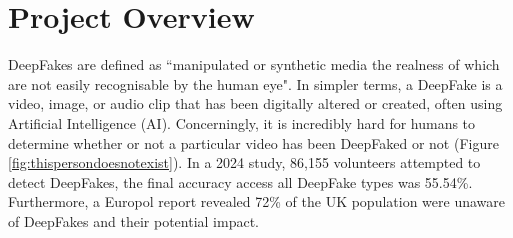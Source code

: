 
\section{Project Overview}
\label{sec:project-review}

DeepFakes are defined as ``manipulated or synthetic media the realness of which are not easily recognisable by the human eye"\cite{altuncu2024deepfake}. In simpler terms, a DeepFake is a video, image, or audio clip that has been digitally altered or created, often using Artificial Intelligence (AI). Concerningly, it is incredibly hard for humans to determine whether or not a particular video has been DeepFaked or not (Figure \ref{fig:thispersondoesnotexist}). In a 2024 study, 86,155 volunteers attempted to detect DeepFakes, the final accuracy access all DeepFake types was 55.54\%\cite{diel2024human}. Furthermore, a Europol report revealed 72\% of the UK population were unaware of DeepFakes and their potential impact\cite{europol2022facing}.

